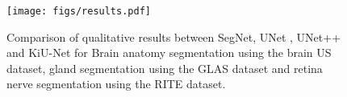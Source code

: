 \documentclass[journal,twoside,web]{ieeecolor}
\begin{document}
\begin{comment}
\begin{table}[]
\caption{Comparison of quantitative metrics for the Brain Anatomy segmentation US dataset.}
\begin{tabular}{
>{\columncolor[HTML]{FFFFFF}}c 
>{\columncolor[HTML]{FFFFFF}}c 
>{\columncolor[HTML]{FFFFFF}}c 
>{\columncolor[HTML]{FFFFFF}}c 
>{\columncolor[HTML]{FFFFFF}}c }
\hline
Performance Metrics & Seg-Net & U-Net & U-Net++ & KiU-Net \\ \hline
Dice & 0.8279 & 0.8537 &0.8659  & \textbf{0.8943} \\
Jaccard & 0.7502 & 0.7931 &0.7995  & \textbf{0.8326}
\end{tabular}
\label{brain}
\end{table}


\begin{table}[]
\caption{Comparison of performance metrics for the GlAS dataset}
\begin{tabular}{
>{\columncolor[HTML]{FFFFFF}}c 
>{\columncolor[HTML]{FFFFFF}}c 
>{\columncolor[HTML]{FFFFFF}}c 
>{\columncolor[HTML]{FFFFFF}}c 
>{\columncolor[HTML]{FFFFFF}}c }
\hline
Performance Metrics & Seg-Net & U-Net & U-Net++ & KiU-Net \\ \hline
Dice & 0.7861 & 0.7976 & 0.8005  & \textbf{0.8325} \\
Jaccard & 0.6596 & 0.6763 &0.6893  & \textbf{0.7278}
\end{tabular}
\end{table}


\begin{table}[]
\caption{Comparison of performance metrics for the RITE Dataset}
\begin{tabular}{
>{\columncolor[HTML]{FFFFFF}}c 
>{\columncolor[HTML]{FFFFFF}}c 
>{\columncolor[HTML]{FFFFFF}}c 
>{\columncolor[HTML]{FFFFFF}}c 
>{\columncolor[HTML]{FFFFFF}}c }
\hline
Performance Metrics & Seg-Net & U-Net & U-Net++ & KiU-Net \\ \hline
Dice & 0.5223 & 0.5524 &0.5410  & 0.7517 \\
Jaccard & 0.3914 & 0.3111 &0.3724  & 0.6037
\end{tabular}
\end{table}

\end{comment}


\begin{figure}[htbp!]
	\centering
	\texttt{[image: figs/results.pdf]}\\
	
	
	\caption{Comparison of qualitative results between SegNet, UNet , UNet++ and KiU-Net for Brain anatomy segmentation using the brain US dataset, gland segmentation using the GLAS dataset and retina nerve segmentation using the RITE dataset. }
	\label{res1}
	
\end{figure}
\end{document}
